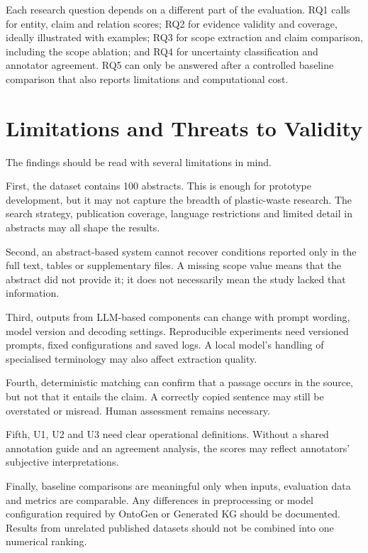 \documentclass[11pt,a4paper]{article}
\begin{document}
Each research question depends on a different part of the evaluation. RQ1 calls for entity, claim and relation scores; RQ2 for evidence validity and coverage, ideally illustrated with examples; RQ3 for scope extraction and claim comparison, including the scope ablation; and RQ4 for uncertainty classification and annotator agreement. RQ5 can only be answered after a controlled baseline comparison that also reports limitations and computational cost.

\section{Limitations and Threats to Validity}

The findings should be read with several limitations in mind.

First, the dataset contains 100 abstracts. This is enough for prototype development, but it may not capture the breadth of plastic-waste research. The search strategy, publication coverage, language restrictions and limited detail in abstracts may all shape the results.

Second, an abstract-based system cannot recover conditions reported only in the full text, tables or supplementary files. A missing scope value means that the abstract did not provide it; it does not necessarily mean the study lacked that information.

Third, outputs from LLM-based components can change with prompt wording, model version and decoding settings. Reproducible experiments need versioned prompts, fixed configurations and saved logs. A local model's handling of specialised terminology may also affect extraction quality.

Fourth, deterministic matching can confirm that a passage occurs in the source, but not that it entails the claim. A correctly copied sentence may still be overstated or misread. Human assessment remains necessary.

Fifth, U1, U2 and U3 need clear operational definitions. Without a shared annotation guide and an agreement analysis, the scores may reflect annotators' subjective interpretations.

Finally, baseline comparisons are meaningful only when inputs, evaluation data and metrics are comparable. Any differences in preprocessing or model configuration required by OntoGen or Generated KG should be documented. Results from unrelated published datasets should not be combined into one numerical ranking.
\end{document}
